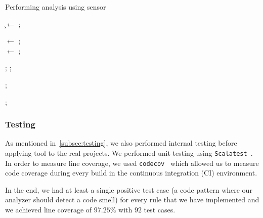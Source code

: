 \begin{algorithm} [!htb]
    \caption{Performing analysis using sensor}
    \label{alg:sensor_algorithm}
    \BlankLine

    \c$\leftarrow$ \CreateClassPath; \\

     {
        \AST$\leftarrow$ \ParseJavaFile { \j }; \\
        \AstWithSymbolicModel$\leftarrow$ \UpdateSymbolicModel{\j, \c};

         {
            \Scan{\r, \AstWithSymbolicModel};
        };
    }

     {
        \AfterAllScanned{};
    }

    \UploadResults{};
\end{algorithm}

\FloatBarrier

\subsubsection{Testing}



As mentioned in~\ref{subsec:testing}, we also performed internal testing before applying tool to the real projects.
We performed unit testing using \verb|Scalatest|~\cite{scalatest}.
In order to measure line coverage, we used \verb|codecov|~\cite{codecov} which allowed us to measure
code coverage during every build in the continuous integration (CI) environment.

In the end, we had at least a single positive test case (a code pattern where our analyzer should detect a code smell)
for every rule that we have implemented and we achieved line coverage of $97.25\%$ with $92$ test cases.

